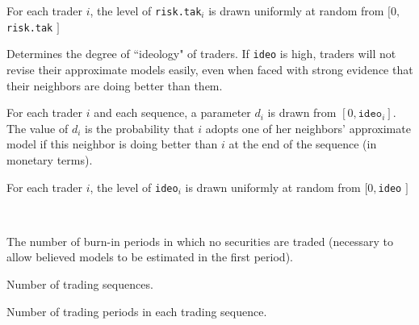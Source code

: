 \documentclass[10pt,a4paper]{article}
\begin{document}
\begin{description}
\begin{description}
 	For each trader $i$, the level of \texttt{risk.tak}$_i$ is drawn uniformly at random from $[0,$\texttt{risk.tak} $]$
 	
 	\item [\texttt{ideo}$_i$.]  Determines the degree of ``ideology" of traders. If \texttt{ideo} is high, traders will not
 	 revise their approximate models easily, even when faced with
 	 strong evidence that their neighbors are doing better than them.
 	 
 	  For each trader $i$ and each sequence, a parameter $d_{i}$ is drawn from $[0, \texttt{ideo}_i]$. The value of $d_{i}$ is the probability that $i$ adopts one of her neighbors' approximate model if this neighbor is doing better than $i$ at the end of the sequence (in monetary terms).
 	  
 	  For each trader $i$, the level of \texttt{ideo}$_i$ is drawn uniformly at random from $[0,$\texttt{ideo} $]$
 \end{description}	 
 	
 	\item[Timing parameters.]~
 	
 	\begin{description}
 			\setlength\itemsep{0em}
 		\item [\texttt{burn.in}.] The number of burn-in periods in which no securities are traded (necessary to allow believed models to be estimated in the first period).
 		\item [\texttt{n.seq}.] Number of trading sequences.
 		\item [\texttt{horizon}.] Number of trading periods in each trading sequence.
 	\end{description}
 
 \end{description}




\end{document}
